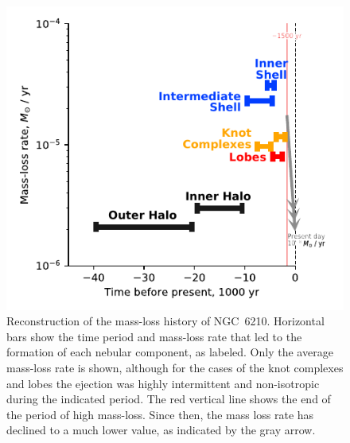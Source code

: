 \documentclass[useAMS, usenatbib]{mnras}
\begin{document}
\begin{figure}
  \includegraphics[width=\linewidth]
  {figs/mass-loss-history-annotated}
  \caption{
    Reconstruction of the mass-loss history of NGC~6210.
    Horizontal bars show the time period and mass-loss rate that led to the formation of each nebular component, as labeled.
    Only the average mass-loss rate is shown,
    although for the cases of the knot complexes and lobes the ejection was highly intermittent and non-isotropic during the indicated period.
    The red vertical line shows the end of the period of high mass-loss.
    Since then, the mass loss rate has declined to a much lower value, as indicated by the gray arrow.
  }
  \label{fig:mass-loss-history}
\end{figure}
\end{document}
